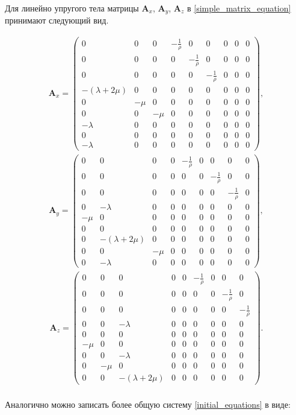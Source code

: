 	Для линейно упругого тела матрицы $\mathbf{A}_x$, $\mathbf{A}_y$, $\mathbf{A}_z$ в \eqref{simple_matrix_equation} принимают следующий вид.

\begin{align}
\label{isotropic_mat1}
\mathbf{A}_x =
\left( \begin{array}{cccccccccccc}
0 & 0 & 0 & -\frac 1 \rho & 0 & 0 & 0 & 0 & 0 \\ 
0 & 0 & 0 & 0 & -\frac 1 \rho & 0 & 0 & 0 & 0 \\ 
0 & 0 & 0 & 0 & 0 & -\frac 1 \rho & 0 & 0 & 0 \\ 
-(\lambda+2\mu) & 0 & 0 & 0 & 0 & 0 & 0 & 0 & 0 \\ 
0 & -\mu & 0 & 0 & 0 & 0 & 0 & 0 & 0 \\ 
0 & 0 & -\mu & 0 & 0 & 0 & 0 & 0 & 0 \\ 
-\lambda & 0 & 0 & 0 & 0 & 0 & 0 & 0 & 0 \\ 
0 & 0 & 0 & 0 & 0 & 0 & 0 & 0 & 0 \\ 
-\lambda & 0 & 0 & 0 & 0 & 0 & 0 & 0 & 0  
\end{array} \right),
\end{align} 
\begin{align}
\label{isotropic_mat2}
\mathbf{A}_y =
\left( \begin{array}{cccccccccccc}
0 & 0 & 0 & 0 & -\frac 1 \rho & 0 & 0 & 0 & 0 \\ 
0 & 0 & 0 & 0 & 0 & 0 & -\frac 1 \rho & 0 & 0 \\ 
0 & 0 & 0 & 0 & 0 & 0 & 0 & -\frac 1 \rho & 0 \\ 
0 & -\lambda & 0 & 0 & 0 & 0 & 0 & 0 & 0 \\ 
-\mu & 0 & 0 & 0 & 0 & 0 & 0 & 0 & 0 \\ 
0 & 0 & 0 & 0 & 0 & 0 & 0 & 0 & 0 \\ 
0 & -(\lambda+2\mu) & 0 & 0 & 0 & 0 & 0 & 0 & 0 \\ 
0 & 0 & -\mu & 0 & 0 & 0 & 0 & 0 & 0 \\ 
0 & -\lambda & 0 & 0 & 0 & 0 & 0 & 0 & 0  
\end{array} \right),
\end{align}
\begin{align}
\label{isotropic_mat3}
\mathbf{A}_z =
\left( \begin{array}{cccccccccccc}
0 & 0 & 0 & 0 & 0 & -\frac 1 \rho & 0 & 0 & 0 \\ 
0 & 0 & 0 & 0 & 0 & 0 & 0 & -\frac 1 \rho & 0 \\ 
0 & 0 & 0 & 0 & 0 & 0 & 0 & 0 & -\frac 1 \rho \\ 
0 & 0 & -\lambda & 0 & 0 & 0 & 0 & 0 & 0 \\ 
0 & 0 & 0 & 0 & 0 & 0 & 0 & 0 & 0 \\ 
-\mu & 0 & 0 & 0 & 0 & 0 & 0 & 0 & 0 \\ 
0 & 0 & -\lambda & 0 & 0 & 0 & 0 & 0 & 0 \\ 
0 & -\mu & 0 & 0 & 0 & 0 & 0 & 0 & 0 \\ 
0 & 0 & -(\lambda+2\mu) & 0 & 0 & 0 & 0 & 0 & 0  
\end{array} \right).
\end{align}\\
	Аналогично можно записать более общую систему \eqref{initial_equations} в виде:

